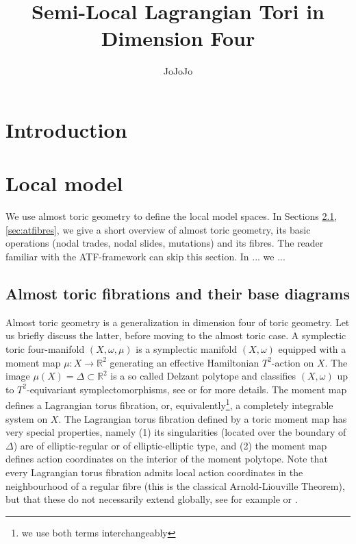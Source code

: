 \documentclass[12pt,a4paper,draft]{scrartcl}
\begin{document}
\title{Semi-Local Lagrangian Tori in Dimension Four}
\author{JoJoJo}

\maketitle

\section{Introduction}

\section{Local model}

We use almost toric geometry to define the local model spaces. In Sections \ref{sec:atgeometry},\ref{sec:atfibres}, we give a short overview of almost toric geometry, its basic operations (nodal trades, nodal slides, mutations) and its fibres. The reader familiar with the ATF-framework can skip this section. In ... we ...


\subsection{Almost toric fibrations and their base diagrams}
\label{sec:atgeometry}

Almost toric geometry is a generalization in dimension four of toric geometry. Let us briefly discuss the latter, before moving to the almost toric case. A symplectic toric four-manifold $(X,\omega,\mu)$ is a symplectic manifold $(X,\omega)$ equipped with a moment map $\mu \colon X \rightarrow \mathbb{R}^2$ generating an effective Hamiltonian $T^2$-action on $X$. The image $\mu(X) = \Delta \subset \mathbb{R}^2$ is a so called Delzant polytope and classifies $(X,\omega)$ up to $T^2$-equivariant symplectomorphisms, see \cite{Del88} or \cite{Can03} for more details. The moment map defines a Lagrangian torus fibration, or, equivalently\footnote{we use both terms interchangeably}, a completely integrable system on $X$. The Lagrangian torus fibration defined by a toric moment map has very special properties, namely (1) its singularities (located over the boundary of $\Delta$) are of elliptic-regular or of elliptic-elliptic type, and (2) the moment map defines action coordinates on the interior of the moment polytope. Note that every Lagrangian torus fibration admits local action coordinates in the neighbourhood of a regular fibre (this is the classical Arnold-Liouville Theorem), but that these do not necessarily extend globally, see for example \cite{Dui80} or \cite{Zun96,Zun03}.
\end{document}
